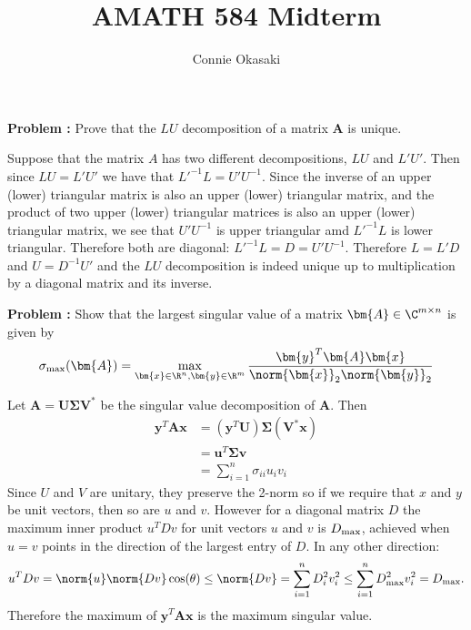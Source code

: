 \documentclass[letter, 12pt]{article}
\title{AMATH 584 Midterm}
\author{Connie Okasaki}
\newcounter{probnum}
\newenvironment{problem}[1][]
   {\begin{framed} \textbf{Problem \theprobnum: #1}}
   {\end{framed}\stepcounter{probnum}}
\begin{document}
\maketitle

\begin{problem}[]
Prove that the $LU$ decomposition of a matrix $\bm{A}$ is unique.
\end{problem}

Suppose that the matrix $A$ has two different decompositions, $LU$ and $L'U'$. Then since $LU=L'U'$ we have that $L'^{-1}L = U'U^{-1}$. Since the inverse of an upper (lower) triangular matrix is also an upper (lower) triangular matrix, and the product of two upper (lower) triangular matrices is also an upper (lower) triangular matrix, we see that $U'U^{-1}$ is upper triangular amd $L'^{-1}L$ is lower triangular. Therefore both are diagonal: $L'^{-1}L = D = U'U^{-1}$. Therefore $L = L'D$ and $U = D^{-1}U'$ and the $LU$ decomposition is indeed unique up to multiplication by a diagonal matrix and its inverse.

\begin{problem}[]
Show that the largest singular value of a matrix $\bm{A}\in \C^{m\times n}$ is given by
\[
\sigma_{\rm max}(\bm{A}) = \max_{\bm{x}\in \R^n,\bm{y}\in \R^m} \frac{\bm{y}^T\bm{A}\bm{x}}{\norm{\bm{x}}_2\norm{\bm{y}}_2}
\]
\end{problem}



Let $\bm{A} = \bm{U}\bm{\Sigma}\bm{V}^*$ be the singular value decomposition of $\bm{A}$. Then 
\begin{align*}
\bm{y}^T\bm{A}\bm{x} 
& = (\bm{y}^T\bm{U})\bm{\Sigma}(\bm{V}^*\bm{x}) \\
& = \bm{u}^T\bm{\Sigma}\bm{v} \\
& = \sum_{i=1}^n \sigma_{ii}u_iv_i
\end{align*}
Since $U$ and $V$ are unitary, they preserve the 2-norm so if we require that $x$ and $y$ be unit vectors, then so are $u$ and $v$. However for a diagonal matrix $D$ the maximum inner product $u^TDv$ for unit vectors $u$ and $v$ is $D_{\rm max}$, achieved when $u=v$ points in the direction of the largest entry of $D$. In any other direction:
\[
u^TDv = \norm{u}\norm{Dv}\cos(\theta) \leq \norm{Dv} = \sum_{i=1}^n D_i^2v_i^2 \leq \sum_{i=1}^n D_{\rm max}^2v_i^2 = D_{\rm \max}.\]
Therefore the maximum of $\bm{y}^T\bm{A}\bm{x}$ is the maximum singular value.
\end{document}
